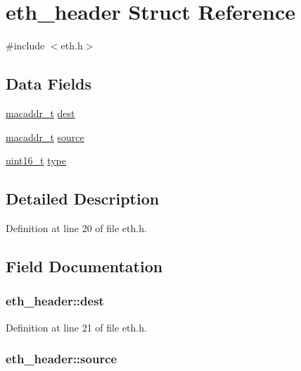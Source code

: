 \hypertarget{structeth__header}{\section{eth\+\_\+header Struct Reference}
\label{structeth__header}
}


{\ttfamily \#include $<$eth.\+h$>$}

\subsection*{Data Fields}
\begin{DoxyCompactItemize}
\item 
\hyperlink{netif_8h_a95d524a06a1ff12a314f88bac04db658}{macaddr\+\_\+t} \hyperlink{structeth__header_a60d1b5300409163d627fbe1f033ef3bc}{dest}
\item 
\hyperlink{netif_8h_a95d524a06a1ff12a314f88bac04db658}{macaddr\+\_\+t} \hyperlink{structeth__header_a2f9bf23af31f9234e9ebe6efdf6f38da}{source}
\item 
\hyperlink{aplus_8h_a5a8b2dc9e45a9ee81a94ef304fb62505}{uint16\+\_\+t} \hyperlink{structeth__header_a1f44bfea959183d53e42185c107fa7c0}{type}
\end{DoxyCompactItemize}


\subsection{Detailed Description}


Definition at line 20 of file eth.\+h.



\subsection{Field Documentation}
\hypertarget{structeth__header_a60d1b5300409163d627fbe1f033ef3bc}{
\subsubsection[{dest}]{ eth\+\_\+header\+::dest}}\label{structeth__header_a60d1b5300409163d627fbe1f033ef3bc}


Definition at line 21 of file eth.\+h.

\hypertarget{structeth__header_a2f9bf23af31f9234e9ebe6efdf6f38da}{
\subsubsection[{source}]{ eth\+\_\+header\+::source}}\label{structeth__header_a2f9bf23af31f9234e9ebe6efdf6f38da}


